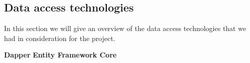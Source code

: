 \subsection{Data access technologies}
In this section we will give an overview of the data access technologies that we had in consideration for the project.


\textbf{Dapper}
\textbf{Entity Framework Core}



